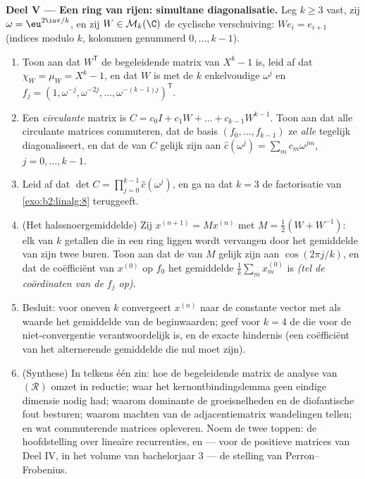 \begin{problem}
\medskip
\noindent\textbf{Deel V --- Een ring van rijen: simultane
diagonalisatie.} Leg $k \geq 3$ vast, zij $\omega =
\eu^{2\iu\pi/k}$, en zij $W \in \mathcal{M}_k(\C)$ de cyclische
verschuiving: $W e_i = e_{i+1}$ (indices modulo $k$, kolommen
genummerd $0, \dots, k-1$).
\begin{enumerate}[resume]
  \item Toon aan dat $W^{\mathsf T}$ de begeleidende matrix van
        $X^k - 1$ is, leid af dat $\chi_W = \mu_W = X^k - 1$, en
        dat $W$  is met de $k$ enkelvoudige
         $\omega^j$ en  $f_j = (1,
        \omega^{-j}, \omega^{-2j}, \dots, \omega^{-(k-1)j})^{\mathsf
        T}$.
  \item Een \emph{circulante} matrix is $C = c_0 I + c_1 W + \dots
        + c_{k-1}W^{k-1}$. Toon aan dat alle circulante matrices
        commuteren, dat de basis $(f_0, \dots, f_{k-1})$ ze
        \emph{alle} tegelijk diagonaliseert, en dat de
         van $C$ gelijk zijn aan $\widehat
        c(\omega^j) = \sum_m c_m \omega^{jm}$, $j = 0, \dots,
        k-1$.
  \item Leid af dat $\det C = \prod_{j=0}^{k-1} \widehat
        c(\omega^j)$, en ga na dat $k = 3$ de factorisatie van
        \cref{exo:b2:linalg:8} teruggeeft.
  \item (Het halssnoergemiddelde) Zij $x^{(n+1)} = Mx^{(n)}$ met
        $M = \frac12(W + W^{-1})$: elk van $k$ getallen die in een
        ring liggen wordt vervangen door het gemiddelde van zijn
        twee buren. Toon aan dat de  van $M$ gelijk
        zijn aan $\cos(2\pi j/k)$, en dat de coëfficiënt van
        $x^{(0)}$ op $f_0$ het gemiddelde $\frac1k\sum_m
        x^{(0)}_m$ is \emph{(tel de coördinaten van de $f_j$ op)}.
  \item Besluit: voor oneven $k$ convergeert $x^{(n)}$ naar de
        constante vector met als waarde het gemiddelde van de
        beginwaarden; geef voor $k = 4$ de  die voor de
        niet-convergentie verantwoordelijk is, en de exacte
        hindernis (een coëfficiënt van het alternerende gemiddelde
        die nul moet zijn).
  \item (Synthese) In telkens één zin: hoe de begeleidende matrix
        de analyse van $(\mathcal R)$ omzet in reductie; waar het
        kernontbindingslemma geen eindige dimensie nodig had;
        waarom dominante  de groeisnelheden en de
        diofantische fout besturen; waarom machten van de
        adjacentiematrix wandelingen tellen; en wat commuterende
        matrices opleveren. Noem de twee toppen: de hoofdstelling
        over lineaire recurrenties, en --- voor de positieve
        matrices van Deel IV, in het volume van bachelorjaar 3 ---
        de stelling van Perron--Frobenius.
\end{enumerate}
\end{problem}
